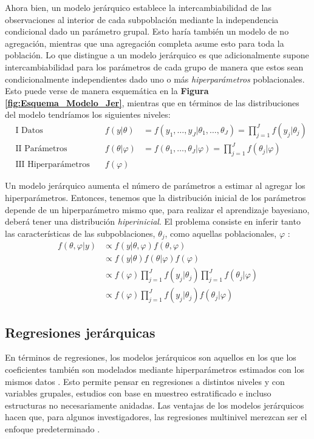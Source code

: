 Ahora bien, un modelo jerárquico establece la intercambiabilidad de las observaciones al interior de cada subpoblación mediante la independencia condicional dado un parámetro grupal. Esto haría también un modelo de no agregación, mientras que una agregación completa asume esto para toda la población. Lo que distingue a un modelo jerárquico es que adicionalmente supone intercambiabilidad para los parámetros de cada grupo de manera que estos sean condicionalmente independientes dado uno o más \textit{hiperparámetros} poblacionales. Esto puede verse de manera esquemática en la \textbf{Figura \ref{fig:Esquema_Modelo_Jer}}, mientras que en términos de las distribuciones del modelo tendríamos los siguientes niveles: 
\begin{align*}
&\text{I Datos} \quad & f(y|\theta)&=f(y_1,\dots,y_J|\theta_1,\dots,\theta_J)=\prod\limits_{j=1}^Jf(y_j|\theta_j) \\
&\text{II Parámetros} \quad & f(\theta|\varphi)&=f(\theta_1,\dots,\theta_J|\varphi) = \prod\limits_{j=1}^Jf(\theta_j|\varphi)  \\
&\text{III Hiperparámetros} \quad & f(\varphi)&
\end{align*}

Un modelo jerárquico aumenta el número de parámetros a estimar al agregar los hiperparámetros. Entonces, tenemos que la distribución inicial de los parámetros depende de un hiperparámetro mismo que, para realizar el aprendizaje bayesiano, deberá tener una distribución \textit{hiperinicial}. El problema consiste en inferir tanto las características de las subpoblaciones, $\theta_j$, como aquellas poblacionales, $\varphi$ \parencite{GP98}: 
\begin{align*}
f(\theta,\varphi|y) & \propto f(y|\theta,\varphi)f(\theta,\varphi) \\
&\propto f(y|\theta)f(\theta|\varphi)f(\varphi) \\
&\propto f(\varphi)\prod\limits_{j=1}^Jf(y_j|\theta_j)\prod\limits_{j=1}^Jf(\theta_j|\varphi) \\
&\propto f(\varphi)\prod\limits_{j=1}^Jf(y_j|\theta_j)f(\theta_j|\varphi)
\end{align*}

\subsection{Regresiones jerárquicas}

En términos de regresiones, los modelos jerárquicos son aquellos en los que los coeficientes también son modelados mediante hiperparámetros estimados con los mismos datos \parencite{GelmanHill06}. Esto permite pensar en regresiones a distintos niveles y con variables grupales, estudios con base en muestreo estratificado e incluso estructuras no necesariamente anidadas. Las ventajas de los modelos jerárquicos hacen que, para algunos investigadores, las regresiones multinivel merezcan ser el enfoque predeterminado \parencite{McElreath15}.\\

